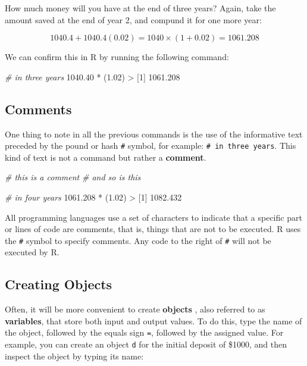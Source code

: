 \documentclass[
]{book}
\newenvironment{Shaded}{\begin{snugshade}}{\end{snugshade}}
\newcommand{\CommentTok}[1]{\textcolor[rgb]{0.56,0.35,0.01}{\textit{#1}}}
\newcommand{\DecValTok}[1]{\textcolor[rgb]{0.00,0.00,0.81}{#1}}
\newcommand{\FloatTok}[1]{\textcolor[rgb]{0.00,0.00,0.81}{#1}}
\newcommand{\NormalTok}[1]{#1}
\newcommand{\SpecialCharTok}[1]{\textcolor[rgb]{0.00,0.00,0.00}{#1}}
\begin{document}
How much money will you have at the end of three years? Again, take the amount
saved at the end of year 2, and compund it for one more year:

\[
1040.4 + 1040.4 (0.02) = 1040 \times (1 + 0.02) = 1061.208
\]

We can confirm this in R by running the following command:

\begin{Shaded}
\begin{Highlighting}[]
\CommentTok{\# in three years}
\FloatTok{1040.40} \SpecialCharTok{*}\NormalTok{ (}\FloatTok{1.02}\NormalTok{)}
\SpecialCharTok{\textgreater{}}\NormalTok{ [}\DecValTok{1}\NormalTok{] }\FloatTok{1061.208}
\end{Highlighting}
\end{Shaded}

\hypertarget{comments}{%
\subsection{Comments}\label{comments}}

One thing to note in all the previous commands is the use of the informative
text preceded by the pound or hash \texttt{\#} symbol, for example: \texttt{\#\ in\ three\ years}.
This kind of text is not a command but rather a \textbf{comment}.

\begin{Shaded}
\begin{Highlighting}[]
\CommentTok{\# this is a comment}
\CommentTok{\# and so is this}

\CommentTok{\# in four years}
\FloatTok{1061.208} \SpecialCharTok{*}\NormalTok{ (}\FloatTok{1.02}\NormalTok{)}
\SpecialCharTok{\textgreater{}}\NormalTok{ [}\DecValTok{1}\NormalTok{] }\FloatTok{1082.432}
\end{Highlighting}
\end{Shaded}

All programming languages use a set of characters to indicate that a specific
part or lines of code are comments, that is, things that are not to be executed.
R uses the \texttt{\#} symbol to specify comments. Any code to the right of \texttt{\#} will
not be executed by R.

\hypertarget{creating-objects}{%
\subsection{Creating Objects}\label{creating-objects}}

Often, it will be more convenient to create \textbf{objects} , also referred to as \textbf{variables}, that store both input and output values. To do this, type the
name of the object, followed by the equals sign \texttt{=}, followed by the assigned
value. For example, you can create an object \texttt{d} for the initial deposit of
\$1000, and then inspect the object by typing its name:
\end{document}
